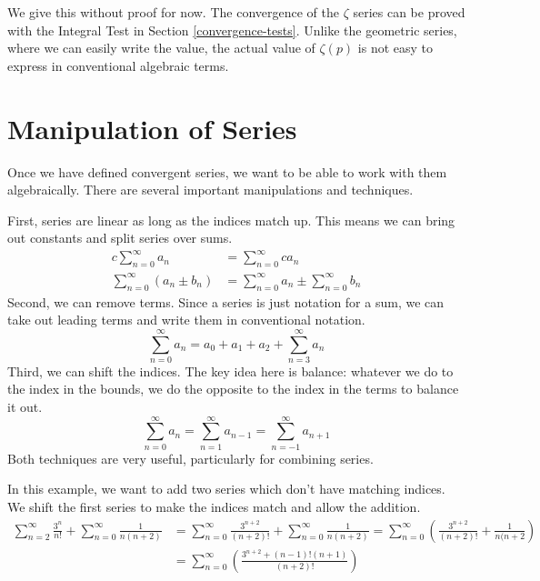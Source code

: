 \documentclass[fleqn,letterpaper]{report}
\begin{document}
We give this without proof for now. The convergence of the
$\zeta$ series can be proved with the Integral Test in
Section \ref{convergence-tests}. Unlike the geometric series, where
we can easily write the value, the actual value of $\zeta(p)$
is not easy to express in conventional algebraic terms.

\section{Manipulation of Series}
\label{manipulation-series}

Once we have defined convergent series, we want to be able to
work with them algebraically. There are several important
manipulations and techniques. 

First, series are linear as long as the indices
match up. This means we can bring out constants and split
series over sums.
\begin{align*}
c \sum_{n=0}^\infty a_n & = \sum_{n=0}^\infty ca_n \\
\sum_{n=0}^\infty (a_n \pm b_n) & = \sum_{n=0}^\infty a_n \pm
\sum_{n=0}^\infty b_n 
\end{align*}
Second, we can remove terms. Since a series is just
notation for a sum, we can take out leading terms and write
them in conventional notation.
\begin{equation*}
\sum_{n=0}^\infty a_n = a_0 + a_1 + a_2 + \sum_{n=3}^\infty a_n
\end{equation*}
Third, we can shift the indices. The key
idea here is balance: whatever we do to the index in the
bounds, we do the opposite to the index in the terms to
balance it out.
\begin{equation*}
\sum_{n=0}^\infty a_n = \sum_{n=1}^\infty a_{n-1} =
\sum_{n=-1}^\infty a_{n+1} 
\end{equation*}
Both techniques are very useful, particularly for combining
series. 

\begin{example}
In this example, we want to add two series which don't
have matching indices. We shift the first series to make the
indices match and allow the addition.
\begin{align*}
\sum_{n=2}^\infty \frac{3^n}{n!} + \sum_{n=0}^\infty
\frac{1}{n(n+2)} & = 
\sum_{n=0}^\infty \frac{3^{n+2}}{(n+2)!} + \sum_{n=0}^\infty
\frac{1}{n(n+2)}
= \sum_{n=0}^\infty \left( \frac{3^{n+2}}{(n+2)!} +
\frac{1}{n(n+2} \right) \\
& = \sum_{n=0}^\infty \left( \frac{3^{n+2} +
(n-1)!(n+1)}{(n+2)!} \right)
\end{align*}
\end{example}
\end{document}
